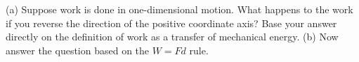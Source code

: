 (a) Suppose work is done in one-dimensional motion. What
happens to the work if you reverse the direction of the
positive coordinate axis? Base your answer directly on the
definition of work as a transfer of mechanical energy.
(b) Now answer the question based on
the $W=Fd$ rule.
